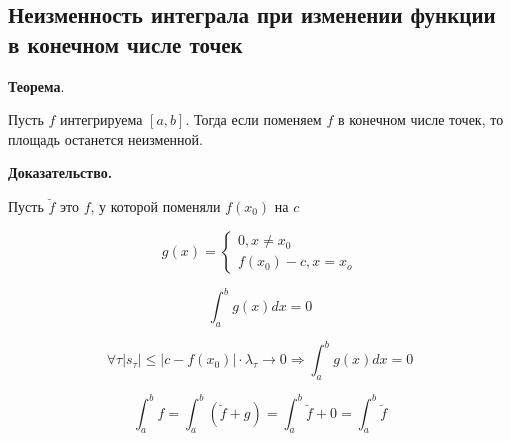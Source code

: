 \documentclass[a4paper]{article}
\begin{document}
\begin{definit}
\hypertarget{p9}{}
\subsection*{Неизменность интеграла при изменении функции в конечном числе точек}
\begin{htheorem}\textbf{Теорема}.

Пусть $f$ интегрируема $[a,b]$. Тогда если поменяем $f$ в конечном числе точек, то площадь останется неизменной.
\end{htheorem}


\begin{hproof}\textbf{Доказательство.}

Пусть $\breve{f}$ это $f$, у которой поменяли $f(x_0)$ на $c$

\[
g(x) = \begin{cases} 0, x \neq x_0 \\ f(x_0) - c, x=x_o  \end{cases}
\]

\[
\int_a^b g(x)dx = 0
\]

\[
\forall \tau |s_\tau| \leq |c - f(x_0)| \cdot \lambda_\tau \rightarrow 0 \Rightarrow \int_a^b g(x)dx = 0
\]

\[
\int_a^b f = \int_a^b (\breve{f} + g) = \int_a^b \breve{f} + 0 =  \int_a^b \breve{f}
\]
\end{hproof}
\end{definit}
\end{document}
